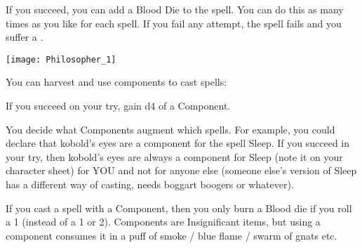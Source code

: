 {

If you succeed, you can add a Blood Die to the spell.  You can do this as many times as you like for each spell. If you fail any \RO attempt, the spell fails and you suffer a .

  \begin{center}
  \texttt{[image: Philosopher\_1]}
  \end{center}



You can harvest and use components to cast spells:


If you succeed on your \RO try, gain d4 \UD of a Component.

You decide what Components augment which spells. For example, you could declare that kobold's eyes are a component for the spell Sleep.  If you succeed in your \RO try, then kobold's eyes are always a component for Sleep (note it on your character sheet) for YOU and not for anyone else (someone else's version of Sleep has a different way of casting, needs boggart boogers or whatever). 

If you cast a spell with a Component, then you only burn a Blood die if you roll a 1 (instead of a 1 or 2).  Components are Insignificant items, but using a component consumes it in a puff of smoke / blue flame / swarm of gnats etc.



}
